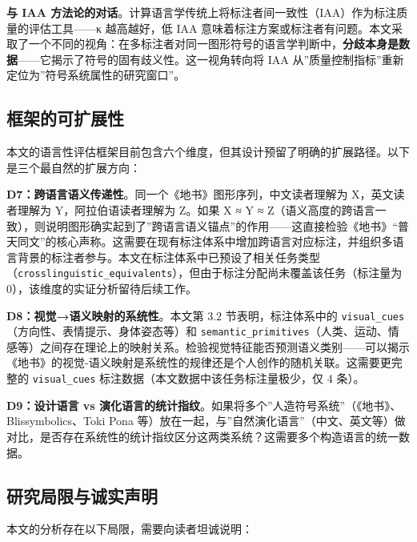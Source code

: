 \documentclass[12pt,a4paper,UTF8,fontset=founder]{ctexart}
\begin{document}
\textbf{与 IAA 方法论的对话}。计算语言学传统上将标注者间一致性（IAA）作为标注质量的评估工具------κ 越高越好，低 IAA 意味着标注方案或标注者有问题。本文采取了一个不同的视角：在多标注者对同一图形符号的语言学判断中，\textbf{分歧本身是数据}------它揭示了符号的固有歧义性。这一视角转向将 IAA 从''质量控制指标''重新定位为''符号系统属性的研究窗口''。

\subsection{框架的可扩展性}\label{ux6846ux67b6ux7684ux53efux6269ux5c55ux6027}

本文的语言性评估框架目前包含六个维度，但其设计预留了明确的扩展路径。以下是三个最自然的扩展方向：

\textbf{D7：跨语言语义传递性}。同一个《地书》图形序列，中文读者理解为 X，英文读者理解为 Y，阿拉伯语读者理解为 Z。如果 X ≈ Y ≈ Z（语义高度的跨语言一致），则说明图形确实起到了''跨语言语义锚点''的作用------这直接检验《地书》``普天同文''的核心声称。这需要在现有标注体系中增加跨语言对应标注，并组织多语言背景的标注者参与。本文在标注体系中已预设了相关任务类型（\texttt{crosslinguistic\_equivalents}），但由于标注分配尚未覆盖该任务（标注量为 0），该维度的实证分析留待后续工作。

\textbf{D8：视觉→语义映射的系统性}。本文第 $3.2$ 节表明，标注体系中的 \texttt{visual\_cues}（方向性、表情提示、身体姿态等）和 \texttt{semantic\_primitives}（人类、运动、情感等）之间存在理论上的映射关系。检验视觉特征能否预测语义类别------可以揭示《地书》的视觉-语义映射是系统性的规律还是个人创作的随机关联。这需要更完整的 \texttt{visual\_cues} 标注数据（本文数据中该任务标注量极少，仅 4 条）。

\textbf{D9：设计语言 vs 演化语言的统计指纹}。如果将多个''人造符号系统''（《地书》、Blissymbolics、Toki Pona 等）放在一起，与''自然演化语言''（中文、英文等）做对比，是否存在系统性的统计指纹区分这两类系统？这需要多个构造语言的统一数据。

\subsection{研究局限与诚实声明}\label{ux7814ux7a76ux5c40ux9650ux4e0eux8bdaux5b9eux58f0ux660e}

本文的分析存在以下局限，需要向读者坦诚说明：
\end{document}
